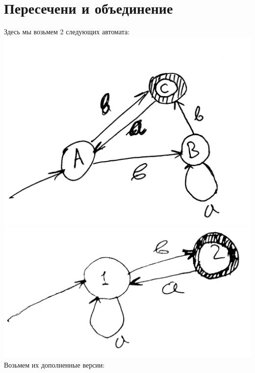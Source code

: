 \documentclass[14pt]{extreport}
\begin{document}
	\section{Пересечени и объединение}
	Здесь мы возьмем 2 следующих автомата:\\
	\includegraphics[scale=0.11]{data/pic5_1.png}\includegraphics[scale=0.11]{data/pic5_4.png}\\
	Возьмем их дополненные версии:\\
\end{document}
